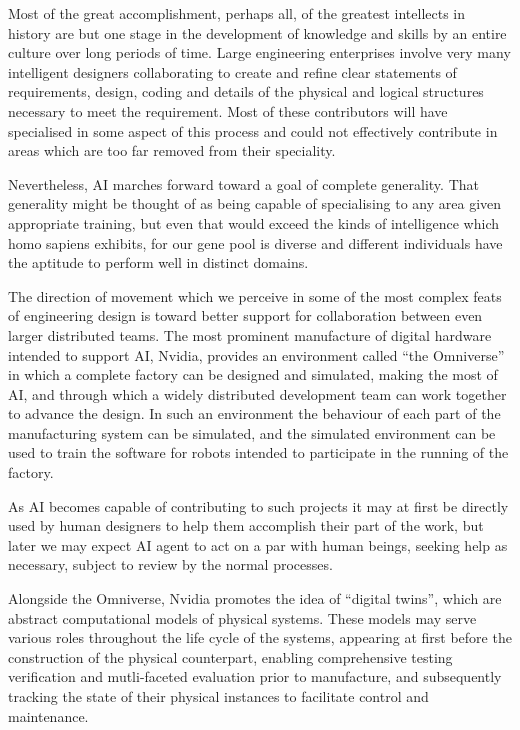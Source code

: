 \documentclass[10pt,titlepage]{book}
\begin{document}
Most of the great accomplishment, perhaps all, of the greatest intellects in history are but one stage in the development of knowledge and skills by an entire culture over long periods of time.
Large engineering enterprises involve very many intelligent designers collaborating to create and refine clear statements of requirements, design, coding and details of the physical and logical structures necessary to meet the requirement.
Most of these contributors will have specialised in some aspect of this process and could not effectively contribute in areas which are too far removed from their speciality.

Nevertheless, AI marches forward toward a goal of complete generality.
That generality might be thought of as being capable of specialising to any area given appropriate training, but even that would exceed the kinds of intelligence which homo sapiens exhibits, for our gene pool is diverse and different individuals have the aptitude to perform well in distinct domains.

The direction of movement which we perceive in some of the most complex feats of engineering design is toward better support for collaboration between even larger distributed teams.
The most prominent manufacture of digital hardware intended to support AI, Nvidia, provides an environment called ``the Omniverse'' in which a complete factory can be designed and simulated, making the most of AI, and through which a widely distributed development team can work together to advance the design.
In such an environment the behaviour of each part of the manufacturing system can be simulated, and the simulated environment can be used to train the software for robots intended to participate in the running of the factory.

As AI becomes capable of contributing to such projects it may at first be directly used by human designers to help them accomplish their part of the work, but later we may expect AI agent to act on a par with human beings, seeking help as necessary, subject to review by the normal processes.

Alongside the Omniverse, Nvidia promotes the idea of ``digital twins'', which are abstract computational models of physical systems.
These models may serve various roles throughout the life cycle of the systems, appearing at first before the construction of the physical counterpart, enabling comprehensive testing verification and mutli-faceted evaluation prior to manufacture, and subsequently tracking the state of their physical instances to facilitate control and maintenance.
\end{document}
